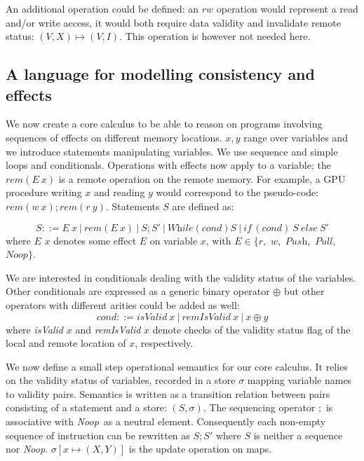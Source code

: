 \documentclass[preprint,12pt]{elsarticle}
\newcommand{\symb}[1]{\textit{#1}}
\newcommand{\noop}{\symb{Noop}}
\newcommand{\Push}{\symb{Push}}
\newcommand{\Pull}{\symb{Pull}}
\newcommand{\while}{\symb{While}}
\newcommand{\cond}{\symb{cond}}
\newcommand{\isvalid}{\symb{isValid}}
\newcommand{\isremvalid}{\symb{remIsValid}}
\newcommand{\rem}[1]{\symb{rem}(#1)}
\newcommand{\IF}[3]{\symb{if}\,(#1)~#2~\symb{else}~#3 }
\begin{document}
An additional operation could be defined: 
 an 
$rw$ operation would represent a read and/or write access, it would both require data 
validity and invalidate 
remote status: $(V,X)\mapsto (V,I)$. This operation is however not needed here.

\subsection{A language for modelling consistency and effects}\label{sec-core}
We now create a core calculus to be able to reason on programs involving sequences of 
effects on different memory locations. $x,y$ range over variables and we introduce  statements manipulating 
variables. We use sequence and simple loops and conditionals. 
Operations with effects 
now apply to a variable;  the $\rem{E~x}$  is a remote operation 
 on the remote memory. For example, a GPU procedure 
writing $x$ and reading $y$ would correspond to the pseudo-code: $\rem{w~x};\rem{r~y}$. 
Statements $S$ are defined as:

{\small \[S::=E~x~|~\rem{E~x}~|~S;S'~|~\while(\cond) S ~|~ \IF{\cond}{S}{S'}\]}
\noindent where $E$ $x$ denotes some effect $E$ on variable $x$, with $E\in \{r,$ $w,$  
$\Push,$ $\Pull,$ $\noop\}$.

We are  interested  in conditionals dealing 
with the validity status of the variables. Other conditionals  are expressed as a generic 
binary operator $\oplus$ but other operators with different arities could be added as 
well:
\[\cond::=\isvalid~x~|~\isremvalid~x~|~x\oplus y\]
\noindent where \textit{isValid} $x$ and \textit{remIsValid} $x$ denote checks of the validity status flag of the local and remote location of $x$, respectively.

We now define a small step operational semantics for our core calculus.
It relies on the validity status of variables, recorded in a store $\sigma$ mapping 
variable names to validity pairs. Semantics is written as a transition relation between 
pairs consisting of a statement and a store: $(S,\sigma)$. The sequencing operator $;$ is associative with \noop\ as a neutral element. 
Consequently each non-empty sequence of instruction can be rewritten as $S;S'$ where $S$ 
is neither a 
sequence nor \noop. $\sigma[x\mapsto (X,Y)]$ is the update operation on maps. 
\end{document}
